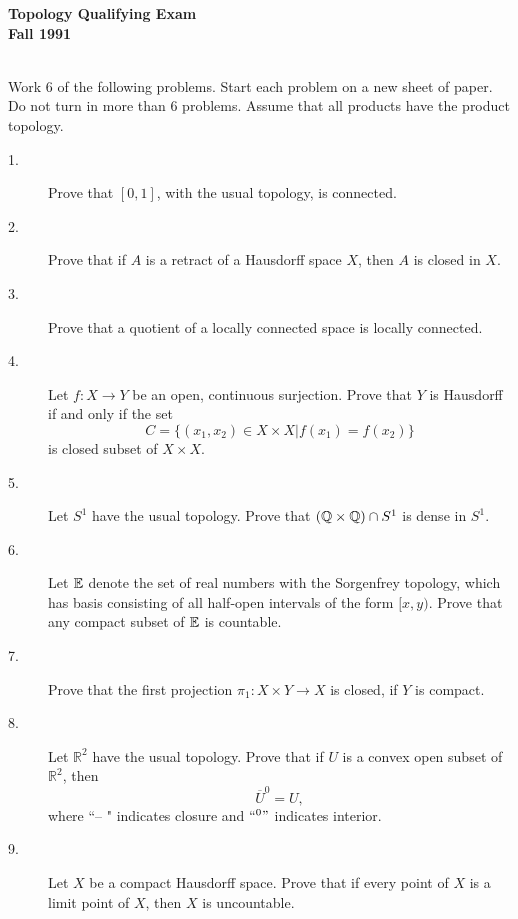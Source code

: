 \documentclass{article}
\def\R{\mathbb R}
\begin{document}


\begin{center}\begin{LARGE}
{\bf Topology Qualifying Exam}\\ 
{\bf Fall 1991}\\ \end{LARGE}
\end{center}
\vspace{0.1in}
\noindent\hrulefill\\

Work 6 of the following problems. Start each problem on a new sheet of paper.
Do not turn in more than 6 problems. Assume that all products have the
product topology.

\begin{description}
\item[1.]
Prove that $[0,1]$, with the usual topology, is connected.

\item[2.]
Prove that if $A$ is a retract of a Hausdorff space $X$, then $A$ is closed
in $X$.

\item[3.]
Prove that a quotient of a locally connected space is locally connected.

\item[4.]
Let $f : X \to Y$ be an open, continuous surjection. Prove that $Y$ is
Hausdorff if and only if the set
$$C= \{(x_1, x_2) \in X \times X |f(x_1) = f(x_2)\}$$
is closed subset of $X \times X$.

\item[5.]
Let $S^1$ have the usual topology. Prove that
$(\Bbb Q \times \Bbb Q) \cap S^1$ is dense in $S^1$.

\item[6.]
Let $\Bbb E$ denote the set of real numbers with the Sorgenfrey topology,
which has basis consisting of all half-open intervals of the form
$[x,y)$. Prove that any compact subset of $\Bbb E$ is countable.

\item[7.]
Prove that the first projection $\pi_1: X \times Y \to X$ is closed, if
$Y$ is compact.

\item[8.]
Let $\R^2$ have the usual topology. Prove that if $U$ is a convex open
subset of $\R^2$, then
$$\overline U^0 = U,$$
where ``-- " indicates closure and $``^0"$ indicates interior.

\item[9.]
Let $X$ be a compact Hausdorff space. Prove that if every point of $X$ is
a limit point of $X$, then $X$ is uncountable.


\end{description}
\end{document}
